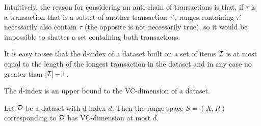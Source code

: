Intuitively, the reason for considering an anti-chain of transactions is  
that, if $\tau$ is a transaction  that is a subset of another transaction
$\tau'$, ranges containing $\tau'$ necessarily also contain $\tau$ (the opposite
is not necessarily true), so it would be impossible to shatter a set containing
both transactions. 


It is easy to see that the d-index of a dataset built on a set of items ${\cal I}$
is at most equal to the length of the longest transaction in the dataset and in
any case no greater than $|{\cal I}|-1$.


The d-index is an upper bound to the VC-dimension of a dataset.

\begin{theorem}\label{lem:vcdimupperb}
  Let ${\cal D}$ be a dataset with d-index $d$. Then the range space $S=(X,R)$
  corresponding to ${\cal D}$ has VC-dimension at most $d$.
\end{theorem}

